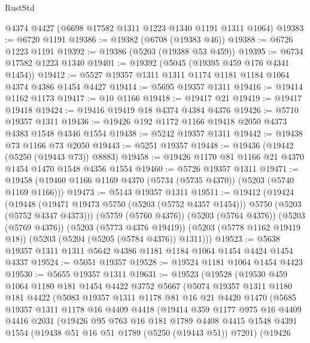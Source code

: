 \begin{lexlean}{RustStd}
\begin{coremodule}
    @4374
    @4427
    (@6698 @17582 @1311 @1223 @1340 @1191 @1311 @1064)
@19383 := @6720 @1191
@19386 := @19382 (@6708 (@19383 @46))
@19388 := @6726 @1223 @1191
@19392 := @19386 (@5203 (@19388 @53 @459))
@19395 := @6734 @17582 @1223 @1340
@19401 := @19392 (@5045 (@19395 @459 @176 @4341 @1454))
@19412 := @5527 @19357 @1311 @1311 @1174 @1181 @1184 @1064 @4374 @4386 @1454 @4427
@19414 := @5695 @19357 @1311
@19416 := @19414 @1162 @1173
@19417 := @10 @1166
@19418 := @19417 @21
@19419 := @19417 @19418
@19424 := @19416 @19419 @18 @4374 @4384 @4376
@19426 := @5710 @19357 @1311
@19436 := @19426 @192 @1172 @1166 @19418 @2050 @4373 @4383 @1548 @4346 @1554
@19438 := @5242 @19357 @1311
@19442 := @19438 @73 @1166 @73 @2050
@19443 := @5251 @19357
@19448 := @19436 (@19442 (@5250 (@19443 @73)) @8883)
@19458 := @19426 @1170 @81 @1166 @21 @4370 @1454 @1470 @1548 @4356 @1554
@19460 := @5726 @19357 @1311
@19471 := @19458 (@19460 @1166 @1169 @4370 (@5734 (@5735 @4370)) (@5203 (@5740 @1169 @1166)))
@19473 := @5143 @19357 @1311
@19511 := @19412
    (@19424
      (@19448 (@19471 @19473 @5750 (@5203 (@5752 @4357 @1454))) @5750 (@5203 (@5752 @4347 @4373)))
      (@5759 (@5760 @4376))
      (@5203 (@5764 @4376))
      (@5203 (@5769 @4376))
      (@5203 (@5773 @4376 @19419))
      (@5203 (@5778 @1162 @19419 @18))
      (@5203 (@5204 (@5205 (@5784 @4376)) @1311)))
@19523 := @5638 @19357 @1311 @1311 @5642 @4386 @1181 @1184 @1064 @1454 @4424 @1454 @4337
@19524 := @5051 @19357
@19528 := @19524 @1181 @1064 @1454 @4423
@19530 := @5655 @19357 @1311
@19631 := @19523
    (@19528
      (@19530
        @459
        @1064
        @1180
        @181
        @1454
        @4422
        @3752
        @5667
        (@5074
          @19357
          @1311
          @1180
          @181
          @4422
          (@5083
            @19357
            @1311
            @1178
            @81
            @16
            @21
            @4420
            @1470
            (@5685
              @19357
              @1311
              @1178
              @16
              @4409
              @4418
              (@19414
                @359
                @1177
                @975
                @16
                @4409
                @4416
                @2031
                (@19426
                  @95
                  @763
                  @16
                  @181
                  @1789
                  @4408
                  @4415
                  @1548
                  @4391
                  @1554
                  (@19438 @51 @16 @51 @1789 (@5250 (@19443 @51)) @7201)
                  (@19426

\end{coremodule}
\end{lexlean}

